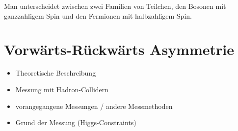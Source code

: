 Man unterscheidet zwischen zwei Familien von Teilchen, den Bosonen mit
ganzzahligem Spin und den Fermionen mit halbzahligem Spin.

\section{Vorwärts-Rückwärts Asymmetrie}
\label{theory:afb}

\begin{itemize}
    \item Theoretische Beschreibung
    \item Messung mit Hadron-Collidern
    \item vorangegangene Messungen / andere Messmethoden
    \item Grund der Messung (Higgs-Constraints)
\end{itemize}



